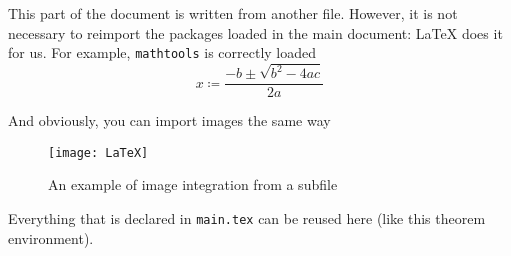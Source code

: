 \documentclass[../main.tex]{subfiles}
\begin{document}
This part of the document is written from another file. However, it is not necessary to reimport the packages loaded in the main document: \LaTeX{} does it for us. For example, \texttt{mathtools} is correctly loaded \[ x \coloneqq \frac{-b \pm \sqrt{b^2-4ac}}{2a} \]

And obviously, you can import images the same way

\begin{figure}
    \centering
    \texttt{[image: LaTeX]}
    \caption{An example of image integration from a subfile}
\end{figure}

\begin{theorem}
Everything that is declared in \texttt{main.tex} can be reused here (like this theorem environment).
\end{theorem}
\end{document}
